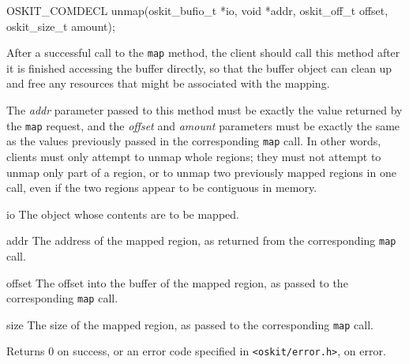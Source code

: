 \begin{apisyn}

	\funcproto OSKIT_COMDECL
	unmap(oskit_bufio_t *io, void *addr,
	      oskit_off_t offset, oskit_size_t amount);
\end{apisyn}
\begin{apidesc}
	After a successful call to the \texttt{map} method,
	the client should call this method
	after it is finished accessing the buffer directly,
	so that the buffer object can clean up
	and free any resources that might be associated with the mapping.

	The \emph{addr} parameter passed to this method
	must be exactly the value returned by the \texttt{map} request,
	and the \emph{offset} and \emph{amount} parameters
	must be exactly the same as the values previously passed
	in the corresponding \texttt{map} call.
	In other words,
	clients must only attempt to unmap whole regions;
	they must not attempt to unmap only part of a region,
	or to unmap two previously mapped regions in one call,
	even if the two regions appear to be contiguous in memory.
\end{apidesc}
\begin{apiparm}
	\item[io]
		The object whose contents are to be mapped.
	\item[addr]
		The address of the mapped region,
		as returned from the corresponding \texttt{map} call.
	\item[offset]
		The offset into the buffer of the mapped region,
		as passed to the corresponding \texttt{map} call.
	\item[size]
		The size of the mapped region,
		as passed to the corresponding \texttt{map} call.
\end{apiparm}
\begin{apiret}
	Returns 0 on success, or an error code specified in
	{\tt <oskit/error.h>}, on error.
\end{apiret}


